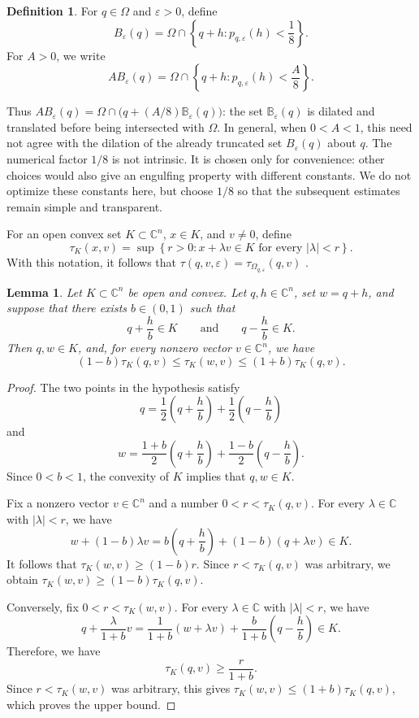 \documentclass[11pt]{article}
\newtheorem{lemma}[theorem]{Lemma}
\theoremstyle{definition}
\newtheorem{definition}[theorem]{Definition}
\newcommand{\C}{\mathbb{C}}
\newcommand{\eps}{\varepsilon}
\begin{document}
 \begin{definition}\label{def:non-isotropic-neighborhood}
 	For \(q\in\Omega\) and \(\eps>0\), define
 	\[
 		B_\eps(q)
 		=
 		\Omega\cap
 		\left\{
 		q+h:p_{q,\eps}(h)<\frac18
 		\right\}.
 	\]
 	For \(A>0\), we write
 \[
 		A B_\eps(q)
 	=
 	\Omega\cap
 	\left\{
 	q+h:p_{q,\eps}(h)<\frac{A}{8}
 	\right\}.
 \]
 
 \end{definition}
Thus \(AB_\eps(q)=\Omega\cap\bigl(q+(A/8)\mathbb B_\eps(q)\bigr)\):
the set \(\mathbb B_\eps(q)\) is dilated and translated before
being intersected with \(\Omega\).
In general, when \(0<A<1\), this need not agree with the dilation of
the already truncated set \(B_\eps(q)\) about \(q\).
The numerical factor \(1/8\) is not intrinsic.  It is chosen only for
convenience: other choices would also give an engulfing property with
different constants.  We do not optimize these constants here, but choose
\(1/8\) so that the subsequent estimates remain simple and transparent.


For an open convex set \(K\subset\C^n\), \(x\in K\), and \(v\ne0\), define
\[
\tau_K(x,v)
=
\sup\left\{
r>0:
x+\lambda v\in K
\text{ for every }|\lambda|<r
\right\}.
\]
With this notation, it follows that
\(\tau(q,v,\eps)
=
\tau_{\Omega_{q,\eps}}(q,v)\)
.


\begin{lemma}\label{lem:convex-center-shift}
Let \(K\subset\C^n\) be open and convex.  Let \(q,h\in\C^n\), set
\(w=q+h\), and suppose that there exists \(b\in(0,1)\) such that
\[
q+\frac{h}{b}\in K
\qquad\text{and}\qquad
q-\frac{h}{b}\in K.
\]
Then \(q,w\in K\), and, for every nonzero vector \(v\in\C^n\), we have
\[
(1-b)\tau_K(q,v)
\le
\tau_K(w,v)
\le
(1+b)\tau_K(q,v).
\]
\end{lemma}

\begin{proof}
The two points in the hypothesis satisfy
\[
q
=
\frac12\left(q+\frac{h}{b}\right)
+
\frac12\left(q-\frac{h}{b}\right)
\]
and
\[
w
=
\frac{1+b}{2}\left(q+\frac{h}{b}\right)
+
\frac{1-b}{2}\left(q-\frac{h}{b}\right).
\]
Since \(0<b<1\), the convexity of \(K\) implies that \(q,w\in K\).

Fix a nonzero vector \(v\in\C^n\) and a number
\(0<r<\tau_K(q,v)\).  For every \(\lambda\in\C\) with
\(|\lambda|<r\), we have
\[
w+(1-b)\lambda v
=
b\left(q+\frac{h}{b}\right)
+(1-b)(q+\lambda v)
\in K.
\]
It follows that
\(\tau_K(w,v)\ge(1-b)r\).
Since \(r<\tau_K(q,v)\) was arbitrary, we obtain
\(\tau_K(w,v)\ge(1-b)\tau_K(q,v)\).

Conversely, fix \(0<r<\tau_K(w,v)\).  For every
\(\lambda\in\C\) with \(|\lambda|<r\), we have
\[
q+\frac{\lambda}{1+b}v
=
\frac1{1+b}(w+\lambda v)
+
\frac{b}{1+b}\left(q-\frac{h}{b}\right)
\in K.
\]
Therefore, we have
\[
\tau_K(q,v)\ge\frac{r}{1+b}.
\]
Since \(r<\tau_K(w,v)\) was arbitrary, this gives
\(\tau_K(w,v)\le(1+b)\tau_K(q,v)\),
which proves the upper bound.
\end{proof}
\end{document}
